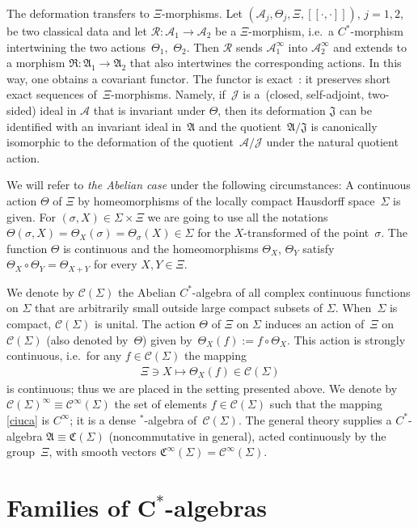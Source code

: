 \documentclass[pdftex]{sigma}
\def\A{{\mathcal A}}
\def\Th{\Theta}
\def\AA{\mathfrak A}
\def\C{\mathcal{C}}
\def\R{\mathcal{R}}
\def\CC{{\mathfrak C}}
\def\RR{{\mathfrak R}}
\def\J{\mathcal J}
\def\JJ{\mathfrak J}
\def\Si{\Sigma}
\providecommand{\CC}{\mathfrak{C}}
\begin{document}
The deformation transfers to $\Xi$-morphisms. Let
$\left(\A_j,\Theta_j,\Xi,[\![\cdot,\cdot]\!]\right)$, $j=1,2$, be two classical data and
let $\R:\A_1\to\A_2$ be a $\Xi$-morphism, i.e.\ a $C^*$-morphism intertwining the
two actions~$\Theta_1$,~$\Theta_2$. Then $\R$ sends $\A^\infty_1$ into $\A^\infty_2$ and extends to a morphism
$\RR:\AA_1\to\AA_2$ that also intertwines the corresponding actions. In this way, one obtains a
covariant functor.
The functor is exact~\cite{Rie1}: it preserves short exact sequences of~$\Xi$-morphisms. Namely, if~$\J$ is a~(closed,
self-adjoint, two-sided) ideal in $\A$ that is invariant under $\Theta$, then its deformation $\JJ$ can be
identif\/ied with an invariant ideal in~$\AA$ and the quotient~$\AA/\JJ$ is canonically isomorphic to the
deformation  of the quotient~$\A/\J$  under the natural quotient action.

We will refer to {\it the Abelian case} under the following circumstances:
A continuous action $\Theta$ of $\Xi$ by homeomorphisms of the locally compact Hausdorf\/f space~$\Sigma$ is given. For
$(\sigma,X)\in\Sigma\times\Xi$ we are going to use all the notations
$\Theta(\sigma,X)=\Theta_X(\sigma)=\Theta_\sigma(X)\in\Sigma$ for the $X$-transformed of the point~$\sigma$.
The function $\Theta$ is continuous and the homeomorphisms
$\Th_X$, $\Th_Y$ satisfy $\Th_X\circ\Th_Y=\Th_{X+Y}$ for every $X,Y\in\Xi$.

We denote by $\C(\Sigma)$ the Abelian $C^*$-algebra of all complex continuous functions on $\Sigma$
that are arbitrarily small outside large compact subsets of $\Sigma$. When~$\Sigma$ is compact,
$\C(\Si)$ is unital. The action $\Theta$ of $\Xi$ on $\Sigma$ induces an action of~$\Xi$ on
$\C(\Si)$ (also denoted by~$\Theta$) given by~$\Theta_X(f):=f\circ\Theta_X$.
This action is strongly continuous, i.e.\ for any $f\in\C(\Sigma)$ the mapping
\begin{gather}\label{ciuca}
\Xi\ni X\mapsto\Theta_X(f)\in\C(\Sigma)
\end{gather}
is continuous; thus we are placed in the setting presented above.
We denote by $\C(\Si)^\infty\equiv\C^\infty(\Sigma)$ the set of elements $f\in\C(\Sigma)$ such that the
mapping \eqref{ciuca} is $C^\infty$; it is a dense $^*$-algebra of~$\C(\Sigma)$.
The general theory supplies a $C^*$-algebra $\AA\equiv\CC(\Si)$ (noncommutative in general),
acted continuously by the group~$\Xi$, with
smooth vectors $\CC^\infty(\Si)=\C^\infty(\Si)$.


\section[Families of $C^*$-algebras]{Families of $\boldsymbol{C^*}$-algebras}\label{secintra}
\end{document}

